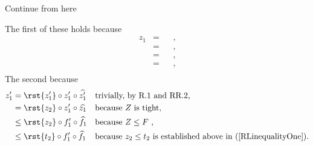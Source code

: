 \begin{worktt} Continue from here
\end{worktt}
The first of these holds because
\begin{align*}
z_1 &= 
        && \mbox{,} \\ 
    &= 
        && \mbox{,} \\ 
    &= 
        && \mbox{,} \\ 
    &= 
        && \mbox{,} \\
\end{align*}
The second because
\begin{align*}
z'_1 &= \rst{z'_1} \circ z'_1  \circ \widehat{z'_1} 
                && \mbox{trivially, by R.1 and RR.2,}\\
         &= \rst{z_2} \circ z'_1  \circ \widehat{z_1} 
         &&\mbox{because $Z$ is tight,}\\
         &\leq \rst{z_2} \circ f'_1  \circ \widehat{f_1}
         &&\mbox{because $Z \leq F$ ,}\\
         &\leq \rst{t_2} \circ f'_1  \circ \widehat{f_1}
         &&\mbox{because $z_2 \leq t_2$ is established
                               above in (\ref{RLinequalityOne}).}
\end{align*}

